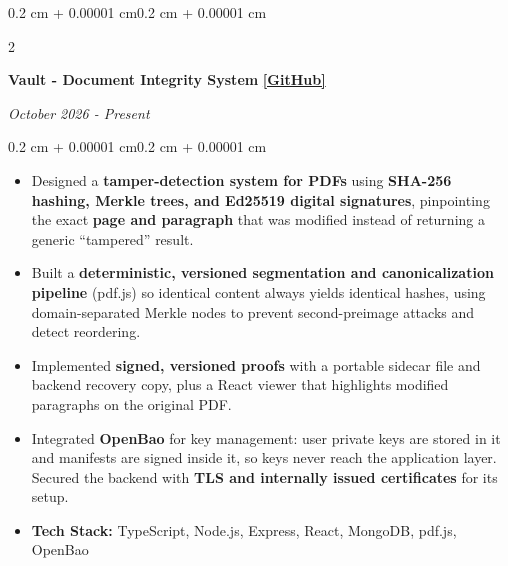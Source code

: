 \documentclass[10pt, letterpaper]{article}
\newenvironment{highlights}{
    \begin{itemize}[
        topsep=0.06 cm,
        parsep=0.06 cm,
        partopsep=0pt,
        itemsep=0pt,
        leftmargin=0.4 cm + 10pt
    ]
}{
    \end{itemize}
}
\newenvironment{onecolentry}{
    \begin{adjustwidth}{0.2 cm + 0.00001 cm}{0.2 cm + 0.00001 cm}
}{
    \end{adjustwidth}
}
\newenvironment{twocolentry}[2][]{
    \onecolentry
    \def\secondColumn{#2}
    \setcolumnwidth{\fill, 4.5 cm}
    \begin{paracol}{2}
}{
    \switchcolumn \raggedleft \secondColumn
    \end{paracol}
    \endonecolentry
}
\let\hrefWithoutArrow\href
\renewcommand{\href}[2]{\hrefWithoutArrow{#1}{\ifthenelse{\equal{#2}{}}{ }{#2 }\raisebox{.15ex}{\footnotesize \faExternalLink*}}}
\begin{document}
    \begin{twocolentry}{\textit{October 2026 - Present}}
        \textbf{Vault - Document Integrity System} \quad
        \hrefWithoutArrow{https://github.com/AkshatRauthan/Vault}{\textbf{[GitHub]}}
    \end{twocolentry}
    \vspace{0.10 cm}
    \begin{onecolentry}
        \begin{highlights}
            \item Designed a \textbf{tamper-detection system for PDFs} using \textbf{SHA-256 hashing, Merkle trees, and Ed25519 digital signatures}, pinpointing 
                the exact \textbf{page and paragraph} that was modified instead of returning a generic ``tampered'' result.
            \item Built a \textbf{deterministic, versioned segmentation and canonicalization pipeline} (pdf.js) so identical content always yields identical hashes, 
                using domain-separated Merkle nodes to prevent second-preimage attacks and detect reordering.
            \item Implemented \textbf{signed, versioned proofs} with a portable sidecar file and backend recovery copy, plus a React viewer that highlights 
                modified paragraphs on the original PDF.
            \item Integrated \textbf{OpenBao} for key management: user private keys are stored in it and manifests are signed inside it, so keys never reach the 
                application layer. Secured the backend with \textbf{TLS and internally issued certificates} for its setup.
            \item \textbf{Tech Stack:} TypeScript, Node.js, Express, React, MongoDB, pdf.js, OpenBao
        \end{highlights}
    \end{onecolentry}
    \vspace{0.3 cm}
\end{document}
